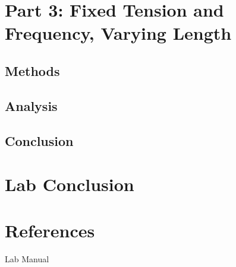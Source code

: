\documentclass[11pt]{article}
\let\oldsection\section
\renewcommand\section{\clearpage\oldsection}
\begin{document}
    \section{Part 3: Fixed Tension and Frequency, Varying Length}\label{sec:part_3}
    \subsection{Methods}\label{subsec:part_3_methods}
    \subsection{Analysis}\label{subsec:part_3_analysis}
    \subsection{Conclusion}\label{subsec:part_3_conclusion}

    \section{Lab Conclusion}\label{sec:lab_conclusion}
    

    \appendix
    \section{References}\label{sec:references}

    Lab Manual
\end{document}
